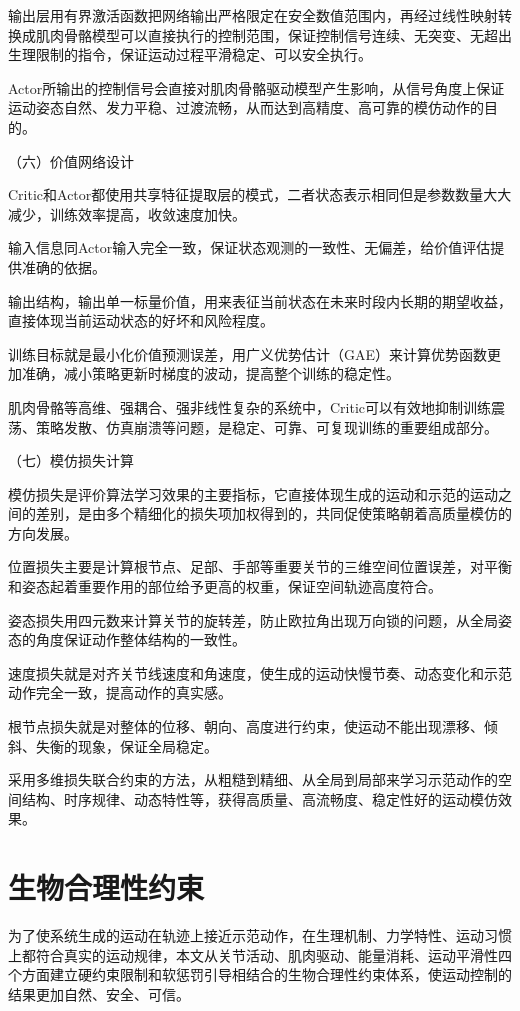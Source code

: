 输出层用有界激活函数把网络输出严格限定在安全数值范围内，再经过线性映射转换成肌肉骨骼模型可以直接执行的控制范围，保证控制信号连续、无突变、无超出生理限制的指令，保证运动过程平滑稳定、可以安全执行。

Actor所输出的控制信号会直接对肌肉骨骼驱动模型产生影响，从信号角度上保证运动姿态自然、发力平稳、过渡流畅，从而达到高精度、高可靠的模仿动作的目的。

（六）价值网络设计

Critic和Actor都使用共享特征提取层的模式，二者状态表示相同但是参数数量大大减少，训练效率提高，收敛速度加快。

输入信息同Actor输入完全一致，保证状态观测的一致性、无偏差，给价值评估提供准确的依据。

输出结构，输出单一标量价值，用来表征当前状态在未来时段内长期的期望收益，直接体现当前运动状态的好坏和风险程度。

训练目标就是最小化价值预测误差，用广义优势估计（GAE）来计算优势函数更加准确，减小策略更新时梯度的波动，提高整个训练的稳定性。

肌肉骨骼等高维、强耦合、强非线性复杂的系统中，Critic可以有效地抑制训练震荡、策略发散、仿真崩溃等问题，是稳定、可靠、可复现训练的重要组成部分。

（七）模仿损失计算

模仿损失是评价算法学习效果的主要指标，它直接体现生成的运动和示范的运动之间的差别，是由多个精细化的损失项加权得到的，共同促使策略朝着高质量模仿的方向发展。

位置损失主要是计算根节点、足部、手部等重要关节的三维空间位置误差，对平衡和姿态起着重要作用的部位给予更高的权重，保证空间轨迹高度符合。

姿态损失用四元数来计算关节的旋转差，防止欧拉角出现万向锁的问题，从全局姿态的角度保证动作整体结构的一致性。

速度损失就是对齐关节线速度和角速度，使生成的运动快慢节奏、动态变化和示范动作完全一致，提高动作的真实感。

根节点损失就是对整体的位移、朝向、高度进行约束，使运动不能出现漂移、倾斜、失衡的现象，保证全局稳定。

采用多维损失联合约束的方法，从粗糙到精细、从全局到局部来学习示范动作的空间结构、时序规律、动态特性等，获得高质量、高流畅度、稳定性好的运动模仿效果。

\section{生物合理性约束}\label{ux751fux7269ux5408ux7406ux6027ux7ea6ux675f}

为了使系统生成的运动在轨迹上接近示范动作，在生理机制、力学特性、运动习惯上都符合真实的运动规律，本文从关节活动、肌肉驱动、能量消耗、运动平滑性四个方面建立硬约束限制和软惩罚引导相结合的生物合理性约束体系，使运动控制的结果更加自然、安全、可信。

